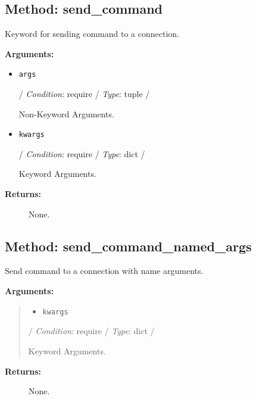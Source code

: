 \hypertarget{qconnectbase-connection-manager-method-send_command-34}{%
\subsection{Method: send\_command}\label{qconnectbase-connection-manager-method-send_command-34}}

Keyword for sending command to a connection.

\textbf{Arguments:}

\begin{itemize}
\item
  \texttt{args}

  / \emph{Condition}: require / \emph{Type}: tuple /

  Non-Keyword Arguments.
\item
  \texttt{kwargs}

  / \emph{Condition}: require / \emph{Type}: dict /

  Keyword Arguments.
\end{itemize}

\begin{description}
\item[\textbf{Returns:}]
None.
\end{description}

\hypertarget{qconnectbase-connection-manager-method-send_command_named_args-35}{%
\subsection{Method:
send\_command\_named\_args}\label{qconnectbase-connection-manager-method-send_command_named_args-35}}

Send command to a connection with name arguments.

\textbf{Arguments:}

\begin{quote}
\begin{itemize}
\tightlist
\item
  \texttt{kwargs}
\end{itemize}

/ \emph{Condition}: require / \emph{Type}: dict /

Keyword Arguments.
\end{quote}

\begin{description}
\item[\textbf{Returns:}]
None.
\end{description}

